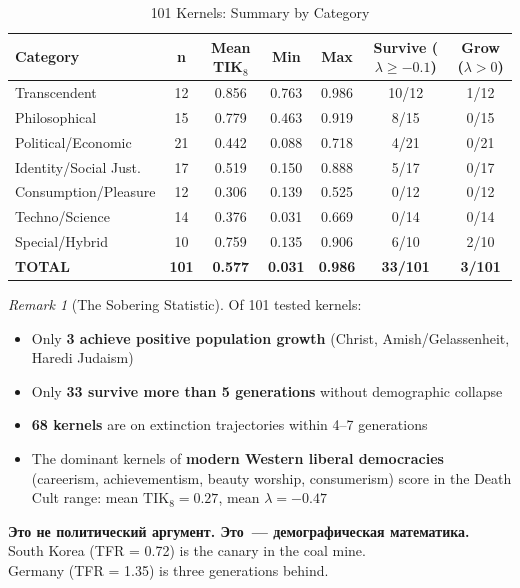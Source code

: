 \documentclass[11pt,a4paper]{article}
\theoremstyle{definition}
\theoremstyle{remark}
\newtheorem{remark}{Remark}
\newcommand{\TIKeight}{\text{TIK}_8}
\begin{document}
\begin{table}[H]
\centering
\caption{101 Kernels: Summary by Category}
\label{tab:kernel-stats}
\begin{tabular}{@{}lcccccc@{}}
\toprule
\textbf{Category} & \textbf{n} &
\textbf{Mean TIK$_8$} & \textbf{Min} & \textbf{Max} &
\textbf{Survive ($\lambda \geq -0.1$)} &
\textbf{Grow ($\lambda > 0$)} \\
\midrule
Transcendent          & 12 & 0.856 & 0.763 & 0.986 & 10/12 & 1/12 \\
Philosophical         & 15 & 0.779 & 0.463 & 0.919 &  8/15 & 0/15 \\
Political/Economic    & 21 & 0.442 & 0.088 & 0.718 &  4/21 & 0/21 \\
Identity/Social Just. & 17 & 0.519 & 0.150 & 0.888 &  5/17 & 0/17 \\
Consumption/Pleasure  & 12 & 0.306 & 0.139 & 0.525 &  0/12 & 0/12 \\
Techno/Science        & 14 & 0.376 & 0.031 & 0.669 &  0/14 & 0/14 \\
Special/Hybrid        & 10 & 0.759 & 0.135 & 0.906 &  6/10 & 2/10 \\
\midrule
\textbf{TOTAL}        & \textbf{101} &
  \textbf{0.577} & \textbf{0.031} & \textbf{0.986} &
  \textbf{33/101} & \textbf{3/101} \\
\bottomrule
\end{tabular}
\end{table}

\begin{remark}[The Sobering Statistic]
Of 101 tested kernels:
\begin{itemize}[noitemsep]
  \item Only \textbf{3 achieve positive population growth}
    (Christ, Amish/Gelassenheit, Haredi Judaism)
  \item Only \textbf{33 survive more than 5 generations}
    without demographic collapse
  \item \textbf{68 kernels} are on extinction trajectories
    within 4--7 generations
  \item The dominant kernels of \textbf{modern Western liberal
    democracies} (careerism, achievementism, beauty worship,
    consumerism) score in the Death Cult range:
    mean $\TIKeight = 0.27$, mean $\lambda = -0.47$
\end{itemize}
\foreignlanguage{russian}{
\textbf{Это не политический аргумент.
Это~--- демографическая математика.}\\
South Korea (TFR = 0.72) is the canary in the coal mine.\\
Germany (TFR = 1.35) is three generations behind.
}
\end{remark}
\end{document}

